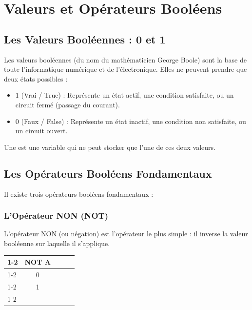 \setcounter{section}{0}
\renewcommand{\chaptername}{\phantom{Chapitre}}\renewcommand{\thechapter}{}
\chapter{Valeurs et Opérateurs Booléens}

\section{Les Valeurs Booléennes : 0 et 1}

Les valeurs booléennes (du nom du mathématicien George Boole) sont la base de toute l'informatique numérique et de l'électronique. Elles ne peuvent prendre que deux états possibles :
\begin{itemize}
    \item 1 (Vrai / True) : Représente un état actif, une condition satisfaite, ou un circuit fermé (passage du courant).
    \item 0 (Faux / False) : Représente un état inactif, une condition non satisfaite, ou un circuit ouvert.
\end{itemize}
   

Une  est une variable qui ne peut stocker que l'une de ces deux valeurs.

\section{Les Opérateurs Booléens Fondamentaux}

Il existe trois opérateurs booléens fondamentaux : 

\subsection{ L'Opérateur NON (NOT)}

L'opérateur NON (ou négation) est l'opérateur le plus simple : il inverse la valeur booléenne sur laquelle il s'applique.

\begin{center}
\begin{tabular}{lllll}
\cline{1-2}
\multicolumn{1}{|l|}{A} & \multicolumn{1}{l|}{NOT A} &  &  &  \\ \cline{1-2}
\multicolumn{1}{|l|}{1} & \multicolumn{1}{c|}{0}     &  &  &  \\ \cline{1-2}
\multicolumn{1}{|l|}{0} & \multicolumn{1}{c|}{1}     &  &  &  \\ \cline{1-2}
                        &                            &  &  & 
\end{tabular}
\end{center}

